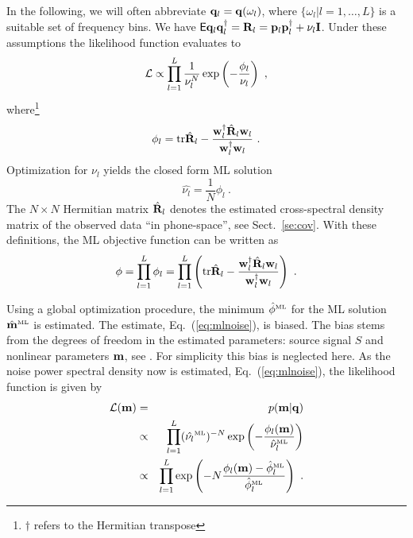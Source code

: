 \documentclass{saclantc}
\newcommand{\ML}[1]{\hat{#1}^{\mbox{\tiny\rm ML}}}
\newcommand{\E}{{\sf E}}
\begin{document}
In the following, we will often abbreviate
${\bf q}_l={\bf q}(\omega_l)$, where 
$\{ \omega_l| l=1,\ldots,L\} $ is a suitable set of frequency bins.
We have $\E {\bf q}_l{\bf q}_l^\dagger = 
  {\bf R}_l = {\bf p}_l{\bf p}_l^{\dagger} + \nu_l{\bf I}$.
Under these assumptions the  likelihood  function 
evaluates to
\begin{equation}
 {\cal L} \propto \prod_{l=1}^{L} \frac{1}{\nu_l^N}
      \exp \left(-\frac{\phi_l}{\nu_l} \right)~,
\end{equation}
where\footnote{$\dagger$ refers to the Hermitian transpose}
\begin{equation}
\phi_l= \mbox{tr} \hat{\bf R}_l- 
\frac{{\bf w}_l^\dagger \hat{\bf R}_l{\bf w}_l}
      {{\bf w}_l^\dagger {\bf w}_l}~.
\label{eq:ml}
\end{equation}
Optimization for $\nu_l$ yields the closed form ML solution
\begin{equation}
\hat{\nu_l}= \frac{1}{N} \phi_l^{}~.
 \label{eq:mlnoise}
\end{equation}
The $N\times N$ Hermitian matrix $\hat{\bf R}_l$ denotes the estimated
cross-spectral density matrix of the observed data ``in phone-space'', 
see Sect.~\ref{se:cov}. With these definitions,
the ML objective function can be written as
\begin{equation} 
 \phi=\prod^L_{l=1} \phi_l= 
 \prod^L_{l=1}\left( \mbox{tr} \hat{\bf R}_l- 
\frac{{\bf w}_l^\dagger \hat{\bf R}_l{\bf w}_l}
      {{\bf w}_l^\dagger {\bf w}_l} \right) ~.
\label{eq:mfp}
\end{equation}

Using a global optimization procedure, the minimum $\ML{\phi}$ for the ML
solution $\ML{\bf m}$ is estimated. 
The estimate, Eq.~(\ref{eq:mlnoise}), is biased. The bias stems from the degrees
    of freedom in the estimated parameters: source signal $S$ and
    nonlinear parameters ${\bf m}$, see \cite{maiwald:icassp94}.
For simplicity this bias is neglected here.
As the noise power spectral density  now is estimated,
Eq.~(\ref{eq:mlnoise}), 
the likelihood function is given by
\begin{eqnarray}
 {\cal L}({\bf m}) &=& p({\bf m} |{\bf q})  \nonumber \\
 &\propto &
  \prod_{l=1}^{L} (\ML{\nu_l})^{-N} \exp 
       \left( -\frac{\phi_l({\bf m})}{\ML{\nu}_l}\right) \nonumber \\
&\propto& 
  \prod_{l=1}^{L}
       \exp \left( -N\frac{\phi_l({\bf m})-\ML{\phi}_l}
        {\ML{\phi}_l}\right)~.
\label{eq:mlmfp}
\end{eqnarray}
\end{document}
